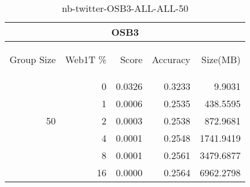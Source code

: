 \begin{center}
\begin{table}[htbp]
\begin{tabular}{ | r | r | r | r | r |}
\hline
\multicolumn{5}{|c|}{OSB3}\\
\hline
\begin{sideways}Group Size\end{sideways} & \begin{sideways}Web1T \%\end{sideways} & \begin{sideways}Score\end{sideways} & \begin{sideways}Accuracy\end{sideways} & \begin{sideways}Size(MB)\end{sideways}\\
\hline
\multirow{5}{*}{50}
 & 0 & 0.0326 & 0.3233 & 9.9031\\ \cline{2-5}
 & 1 & 0.0006 & 0.2535 & 438.5595\\ \cline{2-5}
 & 2 & 0.0003 & 0.2538 & 872.9681\\ \cline{2-5}
 & 4 & 0.0001 & 0.2548 & 1741.9419\\ \cline{2-5}
 & 8 & 0.0001 & 0.2561 & 3479.6877\\ \cline{2-5}
 & 16 & 0.0000 & 0.2564 & 6962.2798\\ \cline{2-5}
\hline
\end{tabular}
\caption{nb-twitter-OSB3-ALL-ALL-50}
\label{table:nb-twitter-OSB3-ALL-ALL-50}
\end{table}
\end{center}

